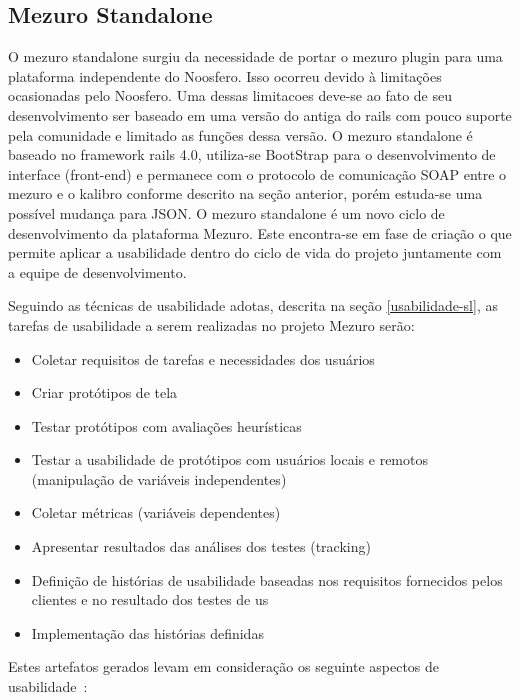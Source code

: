 \subsection{Mezuro Standalone}
\label{mezuro-standalone}

O mezuro standalone surgiu da necessidade de portar o mezuro plugin para uma plataforma independente do Noosfero. Isso ocorreu devido à limitações ocasionadas pelo Noosfero. Uma dessas limitacoes deve-se ao fato de seu desenvolvimento ser baseado em uma versão do antiga do rails com pouco suporte pela comunidade e limitado as funções dessa versão.
O mezuro standalone é baseado no framework rails 4.0, utiliza-se BootStrap para o desenvolvimento de interface (front-end) e permanece com o protocolo de comunicação SOAP entre o mezuro e o kalibro conforme descrito na seção anterior, porém estuda-se uma possível mudança para JSON.
O mezuro standalone é um novo ciclo de desenvolvimento da plataforma Mezuro. Este encontra-se em fase de criação o que permite aplicar a usabilidade dentro do ciclo de vida do projeto juntamente com a equipe de desenvolvimento.

Seguindo as técnicas de usabilidade adotas, descrita na seção \ref{usabilidade-sl}, as tarefas de usabilidade a serem realizadas no projeto Mezuro serão:
\begin{itemize}
\item Coletar requisitos de tarefas e necessidades dos usuários
\item Criar protótipos de tela
\item Testar protótipos com avaliações heurísticas
\item Testar a usabilidade de protótipos com usuários locais e remotos (manipulação de variáveis independentes)
\item Coletar métricas (variáveis dependentes)
\item Apresentar resultados das análises dos testes (tracking)
\item Definição de histórias de usabilidade baseadas nos requisitos fornecidos pelos clientes e no resultado dos testes de us
\item Implementação das histórias definidas
\end{itemize}

Estes artefatos gerados levam em consideração os seguinte aspectos de usabilidade~\cite{ergolist2013}:

